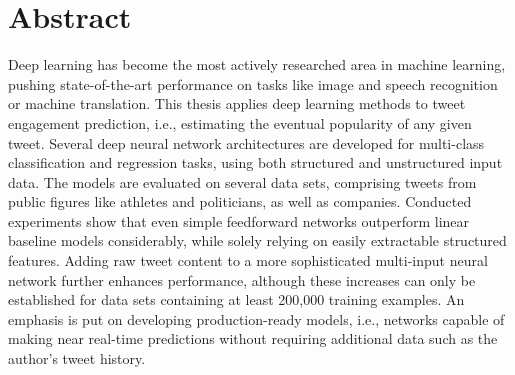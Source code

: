 \section*{Abstract}

Deep learning has become the most actively researched area in machine learning,
pushing state-of-the-art performance on tasks like image and speech recognition
or machine translation.
This thesis applies deep learning methods to tweet engagement prediction, i.e.,
estimating the eventual popularity of any given tweet.
Several deep neural network architectures are developed for multi-class classification
and regression tasks, using both structured and unstructured input data.
The models are evaluated on several data sets, comprising tweets from public
figures like athletes and politicians, as well as companies.
Conducted experiments show that even simple feedforward networks outperform
linear baseline models considerably, while solely relying on easily extractable
structured features.
Adding raw tweet content to a more sophisticated multi-input neural network
further enhances performance, although these increases can only
be established for data sets containing at least 200,000 training examples.
An emphasis is put on developing production-ready models, i.e., networks
capable of making near real-time predictions without requiring additional data
such as the author's tweet history.
